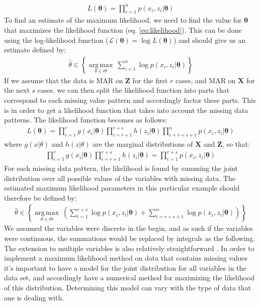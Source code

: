 \documentclass[../thesis.tex]{subfiles}
\begin{document}
\begin{align}
    L(\boldsymbol{\theta}) = \prod_{i=1}^n p(x_i, z_i | \boldsymbol{\theta})
    \label{eq:likelihood}
\end{align}
\noindent To find an estimate of the maximum likelihood, we need to find the value for $\boldsymbol{\theta}$ that maximizes the likelihood function (eq. \ref{eq:likelihood}). This can be done using the log-likelihood function ($\mathcal{L} (\boldsymbol{\theta}) = \log L(\boldsymbol{\theta})$) and should give us an estimate defined by:
\begin{align}
    {\displaystyle {\hat {\theta }}\in \left \{{\underset {\theta \in \Theta }{\operatorname {arg\,max} }}\ \sum_{i=1}^n\log p (x_i, z_i | \boldsymbol{\theta})\right \}}
\end{align}
\noindent If we assume that the data is MAR on $\boldsymbol{Z}$ for the first $r$ cases, and MAR on $\boldsymbol{X}$ for the next $s$ cases, we can then split the likelihood function into parts that correspond to each missing value pattern and accordingly factor these parts. This is in order to get a likelihood function that takes into account the missing data patterns. The likelihood function becomes as follows:
\newpage
\begin{align}
    L(\boldsymbol{\theta}) = \prod_{i=1}^r g(x_i | \boldsymbol{\theta})\prod_{i=r+1}^{r+s} h(z_i | \boldsymbol{\theta})\prod_{i=r+s+1}^n p(x_i, z_i | \boldsymbol{\theta}) 
\end{align}
\noindent where $g(x | \theta)$ and $h(z | \theta)$ are the marginal distributions of $\boldsymbol{X}$ and $\boldsymbol{Z}$, so that:
\begin{align}
    \prod_{i = 1}^r g(x_i | \boldsymbol{\theta}) \prod_{i = r + 1}^{r + s} h(z_i | \boldsymbol{\theta}) = \prod_{i=1}^{r+s} p(x_i, z_i | \boldsymbol{\theta})
\end{align}
\noindent For each missing data pattern, the likelihood is found by summing the joint distribution over all possible values of the variables with missing data. The estimated maximum likelihood parameters in this particular example should therefore be defined by:
\begin{align}
    {\displaystyle {\hat {\theta }}\in \left \{{\underset {\theta \in \Theta }{\operatorname {arg\,max} }}\ \left(\sum_{i=1}^{r+s}\log p(x_i, z_i | \boldsymbol{\theta}) + \sum_{i=r+s+1}^n\log p (x_i, z_i | \boldsymbol{\theta})\right)  \right\}}
\end{align}
\noindent We assumed the variables were discrete in the begin, and as such if the variables were continuous, the summations would be replaced by integrals as the following. The extension to multiple variables is also relatively straightforward \citep{allison1999missing}. In order to implement a maximum likelihood method on data that contains missing values it's important to have a model for the joint distribution for all variables in the data set, and accordingly have a numerical method for maximizing the likelihood of this distribution. Determining this model can vary with the type of data that one is dealing with.\\
\end{document}
